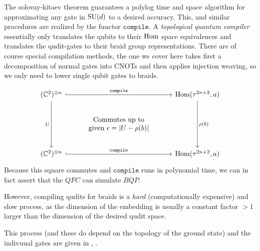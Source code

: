The solovay-kitaev theorem guarantees a polylog time and space algorithm for
approximating any gate in $\mathrm{SU}(d)$ to a desired accuracy. This, and similar
procedures are realized by the functor $\texttt{compile}$. A \emph{topological
quantum compiler} essentially only translates the qubits to their $\operatorname{Hom}$ space
equivalences and translates the qudit-gates to their braid group
representations. There are of course special compilation methods, the one we
cover here takes first a decomposition of normal gates into CNOTs and then
applies injection weaving, so we only need to lower single qubit gates to
braids.

\[
\begin{tikzcd}
	{(\C^2)^{\otimes n}} && {\Hom(\tau^{2n + 2}, a)} \\
	& \begin{array}{c} \text{Commutes up to} \\ \text{given } \epsilon = \vert U - \rho(b) \vert \end{array} \\
	{(\C^2)^{\otimes n}} && {\Hom(\tau^{2n+2}, a)}
	\arrow["{\texttt{compile}}", hook, from=1-1, to=1-3]
	\arrow["U"', from=1-1, to=3-1]
	\arrow["{\rho(b)}", from=1-3, to=3-3]
	\arrow["{\texttt{compile}}", hook, from=3-1, to=3-3]
\end{tikzcd}
\]
Because this square commutes and $\texttt{compile}$ runs in polynomial time, we
can in fact assert that the $QFC$ can simulate $BQP$.

However, compiling qudits for braids is a \emph{hard} (computationally
expensive) and slow process, as the dimension of the embedding is usually a
constant factor $> 1$ larger than the dimension of the desired qudit space. 

This process (and these do depend on the topology of the ground state) and the
indivuual gates are given in \cite{hadjiivanovBraidingFibonacciAnyons2024},
\cite{georgievDiagonalCosetApproach2024}.

